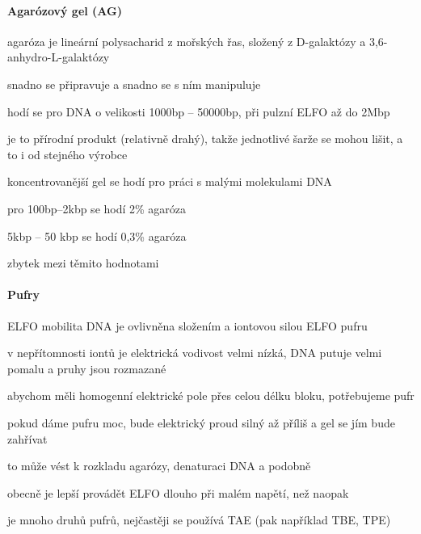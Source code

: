 \documentclass[DIV=8]{scrreprt}
\begin{document}
\paragraph{Agarózový gel (AG)}
\begin{myItemize}[nosep]
    \item agaróza je lineární polysacharid z mořských řas, složený z D-galaktózy a 3,6-anhydro-L-galaktózy
    \item snadno se připravuje a snadno se s ním manipuluje
    \item hodí se pro DNA o velikosti 1000bp -- 50000bp, při pulzní ELFO až do 2Mbp
    \item je to přírodní produkt (relativně drahý), takže jednotlivé šarže se mohou lišit, a to i od stejného výrobce
    \item koncentrovanější gel se hodí pro práci s malými molekulami DNA
\begin{myItemize}[nosep]
    \item pro 100bp--2kbp se hodí 2\% agaróza
    \item 5kbp -- 50 kbp se hodí 0,3\% agaróza
    \item zbytek mezi těmito hodnotami
\end{myItemize}

\end{myItemize}



\paragraph{Pufry}
\begin{myItemize}[nosep]
    \item ELFO mobilita DNA je ovlivněna složením a iontovou silou ELFO pufru
\begin{myItemize}[nosep]
    \item v nepřítomnosti iontů je elektrická vodivost velmi nízká, DNA putuje velmi pomalu a pruhy jsou rozmazané
\end{myItemize}

    \item abychom měli homogenní elektrické pole přes celou délku bloku, potřebujeme pufr
    \item pokud dáme pufru moc, bude elektrický proud silný až příliš a gel se jím bude zahřívat
\begin{myItemize}[nosep]
    \item to může vést k rozkladu agarózy, denaturaci DNA a podobně
    \item obecně je lepší provádět ELFO dlouho při malém napětí, než naopak
\end{myItemize}

    \item je mnoho druhů pufrů, nejčastěji se používá TAE (pak například TBE, TPE)
\end{myItemize}
\end{document}
